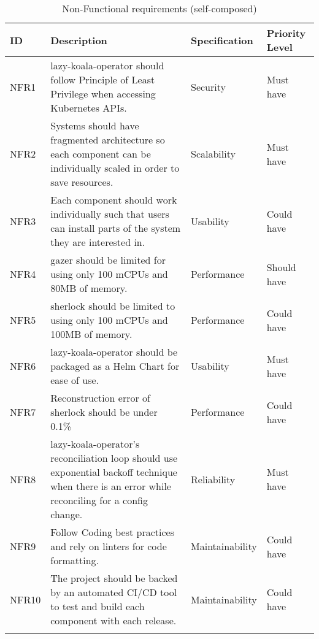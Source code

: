 \begin{longtable}{|p{13mm}|p{89mm}|p{26mm}|p{18mm}|}
\hline
    \textbf{ID} &
    \textbf{Description} &
    \textbf{Specification} &
    \textbf{Priority Level} \\ \hline
    
    NFR1 &
    \ac{lazy-koala-operator} should follow Principle of Least Privilege when accessing Kubernetes APIs. &
    Security &
    Must have \\ \hline
    
    NFR2 &
    Systems should have fragmented architecture so each component can be individually scaled in order to save resources. &
    Scalability &
    Must have \\ \hline
    
    NFR3 &
    Each component should work individually such that users can install parts of the system they are interested in. &
    Usability &
    Could have \\ \hline
    
    NFR4 &
    \ac{gazer} should be limited for using only 100 mCPUs and 80MB of memory. &
    Performance &
    Should have \\ \hline
    
    NFR5 &
    \ac{sherlock} should be limited to using only 100 mCPUs and 100MB of memory. &
    Performance &
    Could have \\ \hline
    
    NFR6 &
    \ac{lazy-koala-operator} should be packaged as a Helm Chart for ease of use. &
    Usability &
    Must have \\ \hline
    
    NFR7 &
    Reconstruction error of \ac{sherlock} should be under 0.1\% &
    Performance &
    Could have \\ \hline
    
    NFR8 &
    \ac{lazy-koala-operator}’s reconciliation loop should use exponential backoff technique when there is an error while reconciling for a config change. &
    Reliability &
    Must have \\ \hline
    
    NFR9 &
    Follow Coding best practices and rely on linters for code formatting. &
    Maintainability &
    Could have \\ \hline
    
    NFR10 &
    The project should be backed by an automated CI/CD tool to test and build each component with each release. &
    Maintainability &
    Could have \\ \hline

\caption{Non-Functional requirements (self-composed)}
\end{longtable}